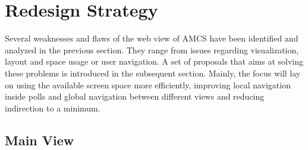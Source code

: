 \section{Redesign Strategy}
\label{section:con:proposals}
Several weaknesses and flaws of the web view of AMCS have been identified and analyzed in the previous section. They range from issues regarding visualization, layout and space usage or user navigation.
A set of proposals that aims at solving these problems is introduced in the subsequent section. Mainly, the focus will lay on using the available screen space more efficiently, improving local navigation inside polls and global navigation between different views and reducing indirection to a minimum.

\subsection{Main View}

